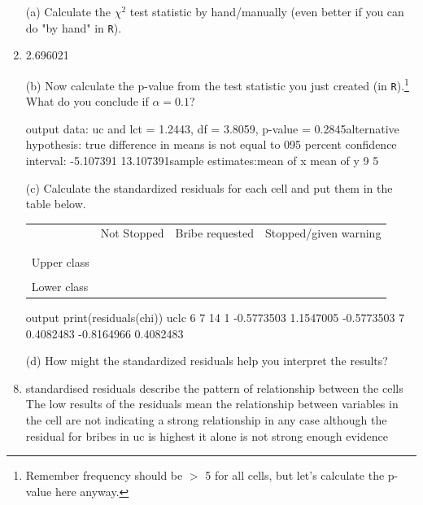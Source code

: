 \documentclass[12pt,letterpaper]{article}
\begin{document}
	\begin{enumerate}
		
		\item [(a)]
		Calculate the $\chi^2$ test statistic by hand/manually (even better if you can do "by hand" in \texttt{R}).\\
		\vspace{5cm}
		
		  
		
		\item  2.696021
		
		
		
			\item [(b)]
		Now calculate the p-value from the test statistic you just created (in \texttt{R}).\footnote{Remember frequency should be $>$ 5 for all cells, but let's calculate the p-value here anyway.}  What do you conclude if $\alpha = 0.1$?\\
		
		
			 
			\item[output] data:  uc and lct = 1.2443, df = 3.8059, p-value = 0.2845alternative hypothesis: true difference in means is not equal to 095 percent confidence interval: -5.107391 13.107391sample estimates:mean of x mean of y         9         5 
		
		\newpage
		\item [(c)] Calculate the standardized residuals for each cell and put them in the table below.
		\vspace{1cm}
		
		\begin{table}[h]
			\centering
			\begin{tabular}{l | c c c }
				& Not Stopped & Bribe requested & Stopped/given warning \\
				\\[-1.8ex] 
				\hline \\[-1.8ex]
				Upper class  &  &  &  \\
				\\
				Lower class &  &   &   \\
				
			\end{tabular}
		\end{table}
		 
		\item[output] print(residuals(chi))   uclc           6          7         14  1 -0.5773503  1.1547005 -0.5773503  7  0.4082483 -0.8164966  0.4082483

		
		\vspace{7cm}
		\item [(d)] How might the standardized residuals help you interpret the results?  
		 
		\item standardised residuals describe the pattern of relationship between the cells
		The low results of the residuals mean the relationship between variables in the cell 
		are not indicating a strong relationship in any case although the residual for bribes 
		in uc is highest it alone is not strong enough evidence
	\end{enumerate}
\end{document}
